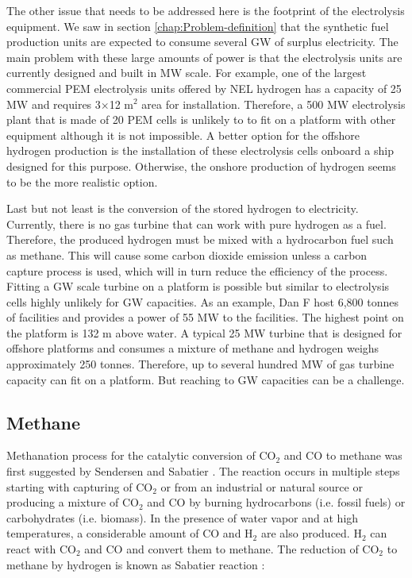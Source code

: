 \documentclass{ECOS_2021}
\begin{document}
The other issue that needs to be addressed here is the footprint of
the electrolysis equipment. We saw in section \ref{chap:Problem-definition}
that the synthetic fuel production units are expected to consume several
GW of surplus electricity. The main problem with these large amounts
of power is that the electrolysis units are currently designed and
built in MW scale. For example, one of the largest commercial PEM
electrolysis units offered by NEL hydrogen has a capacity of 25 MW
and requires 3$\times$12 m$^{2}$ area for installation. Therefore,
a 500 MW electrolysis plant that is made of 20 PEM cells is unlikely
to to fit on a platform with other equipment although it is not impossible.
A better option for the offshore hydrogen production is the installation
of these electrolysis cells onboard a ship designed for this purpose.
Otherwise, the onshore production of hydrogen seems to be the more
realistic option.

Last but not least is the conversion of the stored hydrogen to electricity.
Currently, there is no gas turbine that can work with pure hydrogen
as a fuel. Therefore, the produced hydrogen must be mixed with a hydrocarbon
fuel such as methane. This will cause some carbon dioxide emission
unless a carbon capture process is used, which will in turn reduce
the efficiency of the process. Fitting a GW scale turbine on a platform
is possible but similar to electrolysis cells highly unlikely for
GW capacities. As an example, Dan F host 6,800 tonnes of facilities
and provides a power of 55 MW to the facilities. The highest point
on the platform is 132 m above water. A typical 25 MW turbine that
is designed for offshore platforms and consumes a mixture of methane
and hydrogen weighs approximately 250 tonnes. Therefore, up to several
hundred MW of gas turbine capacity can fit on a platform. But reaching
to GW capacities can be a challenge.

\subsection{Methane}

Methanation process for the catalytic conversion of CO$_{2}$ and
CO to methane was first suggested by Sendersen and Sabatier \cite{boltCriticalReviewSynthetic2020}.
The reaction occurs in multiple steps starting with capturing of CO$_{2}$
or from an industrial or natural source or producing a mixture of
CO$_{2}$ and CO by burning hydrocarbons (i.e. fossil fuels) or carbohydrates
(i.e. biomass). In the presence of water vapor and at high temperatures,
a considerable amount of CO and H$_{2}$ are also produced. H$_{2}$
can react with CO$_{2}$ and CO and convert them to methane. The reduction
of CO$_{2}$ to methane by hydrogen is known as Sabatier reaction
\cite{boltCriticalReviewSynthetic2020}: 
\end{document}
